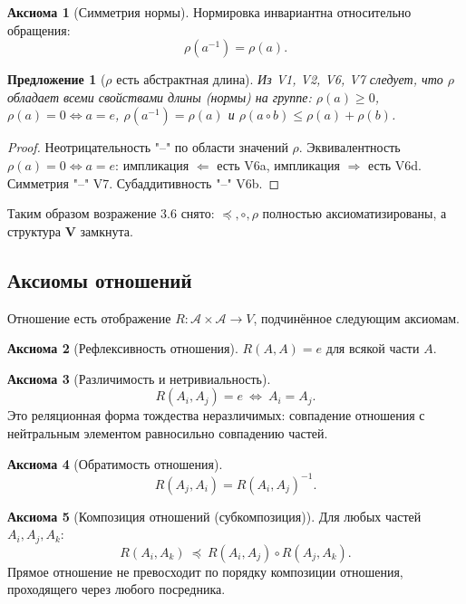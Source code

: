 \documentclass[12pt,a4paper]{article}
\theoremstyle{definition}
\newtheorem{axiom}{Аксиома}[section]
\theoremstyle{plain}
\newtheorem{proposition}{Предложение}[section]
\theoremstyle{remark}
\newcommand{\Parts}{\mathcal A}
\newcommand{\Rel}{R}
\newcommand{\Values}{V}
\newcommand{\Vstruct}{\mathbf V}
\newcommand{\comp}{\circ}
\newcommand{\Vord}{\preceq}
\newcommand{\norm}{\rho}
\newcommand{\ide}{e}
\begin{document}
\begin{axiom}[Симметрия нормы]
Нормировка инвариантна относительно обращения:
\[
\norm(a^{-1})=\norm(a).
\]
\end{axiom}

\begin{proposition}[$\norm$ есть абстрактная длина]
Из V1, V2, V6, V7 следует, что $\norm$ обладает всеми свойствами длины (нормы) на
группе: $\norm(a)\ge0$, $\norm(a)=0\iff a=\ide$, $\norm(a^{-1})=\norm(a)$ и
$\norm(a\comp b)\le\norm(a)+\norm(b)$.
\end{proposition}

\begin{proof}
Неотрицательность "--" по области значений $\norm$. Эквивалентность $\norm(a)=0\iff a=\ide$:
импликация $\Leftarrow$ есть V6a, импликация $\Rightarrow$ есть V6d. Симметрия "--" V7.
Субаддитивность "--" V6b.
\end{proof}

Таким образом возражение 3.6 снято: $\Vord,\comp,\norm$ полностью аксиоматизированы,
а структура $\Vstruct$ замкнута.

\subsection{Аксиомы отношений}

Отношение есть отображение $\Rel:\Parts\times\Parts\to\Values$, подчинённое
следующим аксиомам.

\begin{axiom}[Рефлексивность отношения]
$\Rel(A,A)=\ide$ для всякой части $A$.
\end{axiom}

\begin{axiom}[Различимость и нетривиальность]
\[
\Rel(A_i,A_j)=\ide\ \Longleftrightarrow\ A_i=A_j.
\]
Это реляционная форма тождества неразличимых: совпадение отношения с нейтральным
элементом равносильно совпадению частей.
\end{axiom}

\begin{axiom}[Обратимость отношения]
\[
\Rel(A_j,A_i)=\Rel(A_i,A_j)^{-1}.
\]
\end{axiom}

\begin{axiom}[Композиция отношений (субкомпозиция)]\label{ax:compose}
Для любых частей $A_i,A_j,A_k$:
\[
\Rel(A_i,A_k)\ \Vord\ \Rel(A_i,A_j)\comp\Rel(A_j,A_k).
\]
Прямое отношение не превосходит по порядку композиции отношения, проходящего через
любого посредника.
\end{axiom}
\end{document}
